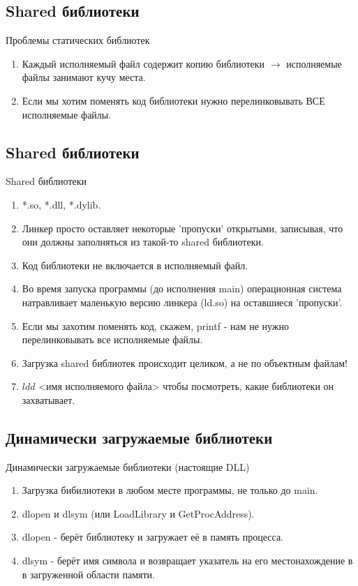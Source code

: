 \documentclass[10pt]{beamer}
\begin{document}
\subsection{Shared библиотеки}
\begin{frame}{Проблемы статических библиотек}
\begin{enumerate}
\item Каждый исполняемый файл содержит копию библиотеки $\rightarrow$ исполняемые файлы занимают кучу места.
\item Если мы хотим поменять код библиотеки нужно перелинковывать ВСЕ исполняемые файлы.
\end{enumerate}
\end{frame}

\subsection{Shared библиотеки}
\begin{frame}{Shared библиотеки}
\begin{enumerate}
\item *.so, *.dll, *.dylib.
\item Линкер просто оставляет некоторые 'пропуски' открытыми, записывая, что они должны заполняться из такой-то shared библиотеки.
\item Код библиотеки не включается в исполняемый файл.
\item Во время запуска программы (до исполнения main) операционная система натравливает маленькую версию линкера (ld.so) на оставшиеся 'пропуски'.
\item Если мы захотим поменять код, скажем, printf - нам не нужно перелинковывать все исполняемые файлы. 
\item Загрузка shared библиотек происходит целиком, а не по объектным файлам!
\item $ldd$ <имя исполняемого файла> чтобы посмотреть, какие библиотеки он захватывает.
\end{enumerate}
\end{frame}

\subsection{Динамически загружаемые библиотеки}
\begin{frame}{Динамически загружаемые библиотеки (настоящие DLL)}
\begin{enumerate}
\item Загрузка бибилиотеки в любом месте программы, не только до main.
\item dlopen и dlsym (или LoadLibrary и GetProcAddress).
\item dlopen - берёт библиотеку и загружает её в память процесса.
\item dlsym - берёт имя символа и возвращает указатель на его местонахождение в в загруженной области памяти.
\end{enumerate}
\end{frame}
\end{document}

